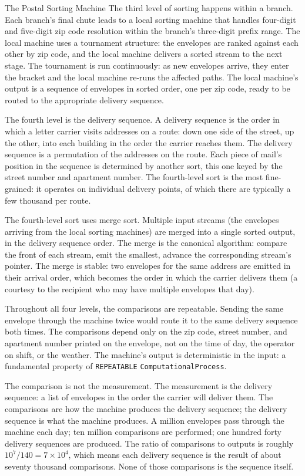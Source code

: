 \begin{coda}{The Postal Sorting Machine}
The third level of sorting happens within a branch. Each branch's final
chute leads to a local sorting machine that handles four-digit and
five-digit zip code resolution within the branch's three-digit prefix
range. The local machine uses a tournament structure: the envelopes
are ranked against each other by zip code, and the local machine
delivers a sorted stream to the next stage. The tournament is run
continuously: as new envelopes arrive, they enter the bracket and the
local machine re-runs the affected paths. The local machine's output
is a sequence of envelopes in sorted order, one per zip code, ready to
be routed to the appropriate delivery sequence.

The fourth level is the delivery sequence. A delivery sequence is the
order in which a letter carrier visits addresses on a route: down one
side of the street, up the other, into each building in the order the
carrier reaches them. The delivery sequence is a permutation of the
addresses on the route. Each piece of mail's position in the sequence
is determined by another sort, this one keyed by the street number and
apartment number. The fourth-level sort is the most fine-grained: it
operates on individual delivery points, of which there are typically a
few thousand per route.

The fourth-level sort uses merge sort. Multiple input streams (the
envelopes arriving from the local sorting machines) are merged into
a single sorted output, in the delivery sequence order. The merge is
the canonical algorithm: compare the front of each stream, emit the
smallest, advance the corresponding stream's pointer. The merge is
stable: two envelopes for the same address are emitted in their
arrival order, which becomes the order in which the carrier delivers
them (a courtesy to the recipient who may have multiple envelopes
that day).

Throughout all four levels, the comparisons are repeatable. Sending
the same envelope through the machine twice would route it to the
same delivery sequence both times. The comparisons depend only on the
zip code, street number, and apartment number printed on the
envelope, not on the time of day, the operator on shift, or the
weather. The machine's output is deterministic in the input: a
fundamental property of \texttt{REPEATABLE} \texttt{ComputationalProcess}.

The comparison is not the measurement. The measurement is the
delivery sequence: a list of envelopes in the order the carrier will
deliver them. The comparisons are how the machine produces the
delivery sequence; the delivery sequence is what the machine produces.
A million envelopes pass through the machine each day; ten million
comparisons are performed; one hundred forty delivery sequences are
produced. The ratio of comparisons to outputs is roughly $10^7 / 140 =
7 \times 10^4$, which means each delivery sequence is the result of
about seventy thousand comparisons. None of those comparisons is the
sequence itself.


\end{coda}
